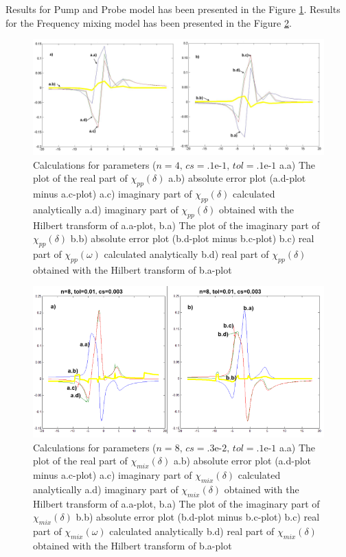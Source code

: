 \documentclass[12pt,twoside,a4paper]{article}
\numberwithin{equation}{subsection}
\numberwithin{figure}{subsection}
\begin{document}
Results for Pump and Probe model has been presented in the Figure \ref{fig:nc_pnp}. Results for the Frequency mixing model has been
presented in the Figure \ref{fig:nc_fmix1}. 

\begin{figure} 
  \includegraphics[width=150mm]{img/nc_pnp.png}
  \caption{Calculations for parameters ($n=4, \,cs=\mbox{.1e-1}, \,tol=\mbox{.1e-1}$
     a.a) The plot of the real part of ${\chi_{pp}}(\delta )$
     a.b) absolute error plot (a.d-plot minus a.c-plot) 
     a.c) imaginary part of ${\chi_{pp}}(\delta )$ calculated analytically 
     a.d) imaginary part of ${\chi_{pp}}(\delta )$ obtained with the Hilbert transform of a.a-plot, 
     b.a) The plot of the imaginary part of ${\chi_{pp}}(\delta )$ 
     b.b) absolute error plot (b.d-plot minus b.c-plot) 
     b.c) real part of $\chi_{pp} (\omega )$ calculated analytically 
     b.d) real part of ${\chi_{pp}}(\delta )$ obtained with the Hilbert transform of b.a-plot 
     \label{fig:nc_pnp}
     }
\end{figure} 

\begin{figure} 
  \includegraphics[width=150mm]{img/nc_fmix1.png}
  \caption{Calculations for parameters ($n=8, \,cs=\mbox{.3e-2}, \,tol=\mbox{.1e-1}$
     a.a) The plot of the real part of ${\chi_{mix}}(\delta )$
     a.b) absolute error plot (a.d-plot minus a.c-plot) 
     a.c) imaginary part of ${\chi_{mix}}(\delta )$ calculated analytically 
     a.d) imaginary part of ${\chi_{mix}}(\delta )$ obtained with the Hilbert transform of a.a-plot, 
     b.a) The plot of the imaginary part of ${\chi_{mix}}(\delta )$ 
     b.b) absolute error plot (b.d-plot minus b.c-plot) 
     b.c) real part of $\chi_{mix} (\omega )$ calculated analytically 
     b.d) real part of ${\chi_{mix}}(\delta )$ obtained with the Hilbert transform of b.a-plot 
     \label{fig:nc_fmix1}
     }
\end{figure}
\end{document}
